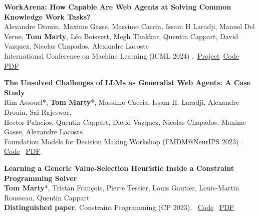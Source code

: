 \documentclass[letterpaper,11pt]{article}
\begin{document}
\begin{tcolorbox}[enhanced, rounded corners, colback=white, colframe=black!10!white, boxrule=0.5mm, left=10pt, right=10pt, top=6pt, bottom=3pt]
    \textbf{WorkArena: How Capable Are Web Agents at Solving Common Knowledge Work Tasks?} \\
    Alexandre Drouin, Maxime Gasse, Massimo Caccia, Issam H Laradji, Manuel Del Verne, \textbf{Tom Marty}, Léo Boisvert, Megh Thakkar, Quentin Cappart, David Vazquez, Nicolas Chapados, Alexandre Lacoste \\
    International Conference on Machine Learning (ICML 2024) .  \hfill
\faLink \,\href{https://servicenow.github.io/WorkArena/}{Project}\quad \faCode\, \href{https://github.com/ServiceNow/WorkArena}{Code}\quad \faFilePdf \, \href{https://openreview.net/forum?id=BRfqYrikdo}{PDF}
\end{tcolorbox}

\begin{tcolorbox}[enhanced, rounded corners, colback=white, colframe=black!10!white, boxrule=0.5mm, left=10pt, right=10pt, top=6pt, bottom=3pt]
    \textbf{The Unsolved Challenges of LLMs as Generalist Web Agents: A Case Study} \\
    Rim Assouel*, \textbf{Tom Marty}*, Massimo Caccia, Issam H. Laradji, Alexandre Drouin, Sai Rajeswar,\\ Hector Palacios, Quentin Cappart, David Vazquez, Nicolas Chapados, Maxime Gasse, Alexandre Lacoste \\
    Foundation Models for Decision Making Workshop (FMDM@NeurIPS 2023) . \hfill \quad \faCode\, \href{https://github.com/ServiceNow/WorkArena}{Code} \quad \faFilePdf \, \href{https://openreview.net/forum?id=jt3il4fC5B}{PDF}
\end{tcolorbox}

\begin{tcolorbox}[enhanced, rounded corners, colback=white, colframe=black!10!white, boxrule=0.5mm, left=10pt, right=10pt, top=6pt, bottom=3pt]
    \textbf{Learning a Generic Value-Selection Heuristic Inside a Constraint Programming Solver} \\
    \textbf{Tom Marty}*, Tristan François, Pierre Tessier, Louis Gautier, Louis-Martin Rousseau, Quentin Cappart \\
    \textbf{Distinguished paper}, Constraint Programming (CP 2023). \hfill \faCode  \, \href{https://github.com/corail-research/SeaPearl.jl}{Code} \quad
    \faFilePdf \, \href{https://arxiv.org/abs/2301.01913}{PDF}
\end{tcolorbox}
\end{document}
